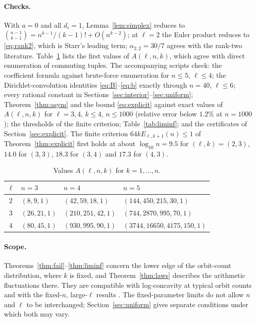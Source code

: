 \documentclass[11pt,a4paper]{article}
\theoremstyle{remark}
\numberwithin{equation}{section}
\begin{document}
\paragraph{Checks.} With $a=0$ and all $d_i=1$, Lemma~\ref{lem:simplex} reduces to $\binom{n-1}{k-1}=n^{k-1}/(k-1)!+O(n^{k-2})$; at $\ell=2$ the Euler product reduces to \eqref{eq:rank2}, which is Starr's leading term; $\alpha_{2,2}=30/7$ agrees with the rank-two literature. Table~\ref{tab:rows} lists the first values of $A(\ell,n,k)$, which agree with direct enumeration of commuting tuples. The accompanying scripts check: the coefficient formula against brute-force enumeration for $n\le5$, $\ell\le4$; the Dirichlet-convolution identities \eqref{eq:B}--\eqref{eq:b} exactly through $n=40$, $\ell\le6$; every rational constant in Sections~\ref{sec:interior}--\ref{sec:uniform}; Theorem~\ref{thm:asym} and the bound \eqref{eq:explicit} against exact values of $A(\ell,n,k)$ for $\ell=3,4$, $k\le4$, $n\le1000$ (relative error below $1.2\%$ at $n=1000$); the thresholds of the finite criterion; Table~\ref{tab:liminf}; and the certificates of Section~\ref{sec:explicit}. The finite criterion $64kE_{\ell,k+1}(n)\le1$ of Theorem~\ref{thm:explicit} first holds at about $\log_{10}n=9.5$ for $(\ell,k)=(2,3)$, $14.0$ for $(3,3)$, $18.3$ for $(3,4)$ and $17.3$ for $(4,3)$.

\begin{table}[ht]
\centering\small
\begin{tabular}{@{}clll@{}}
\toprule
$\ell$ & $n=3$ & $n=4$ & $n=5$\\
\midrule
2 & $(8,9,1)$ & $(42,59,18,1)$ & $(144,450,215,30,1)$\\
3 & $(26,21,1)$ & $(210,251,42,1)$ & $(744,2870,995,70,1)$\\
4 & $(80,45,1)$ & $(930,995,90,1)$ & $(3744,16650,4175,150,1)$\\
\bottomrule
\end{tabular}
\caption{Values $A(\ell,n,k)$ for $k=1,\dots,n$.}\label{tab:rows}
\end{table}

\paragraph{Scope.} Theorems~\ref{thm:fail}--\ref{thm:liminf} concern the lower edge of the orbit-count distribution, where $k$ is fixed, and Theorem~\ref{thm:laws} describes the arithmetic fluctuations there. They are compatible with log-concavity at typical orbit counts \cite{Abdesselam2025b} and with the fixed-$n$, large-$\ell$ results \cite{Abdesselam2025a}. The fixed-parameter limits do not allow $n$ and $\ell$ to be interchanged; Section~\ref{sec:uniform} gives separate conditions under which both may vary.
\end{document}
